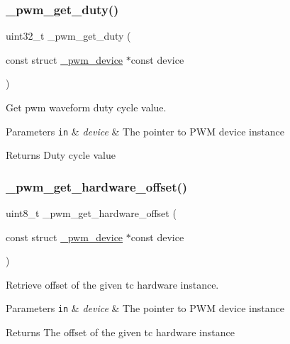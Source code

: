 \subsubsection{\texorpdfstring{\+\_\+pwm\+\_\+get\+\_\+duty()}{\_pwm\_get\_duty()}}
{\footnotesize\ttfamily uint32\+\_\+t \+\_\+pwm\+\_\+get\+\_\+duty (\begin{DoxyParamCaption}\item[{const struct \hyperlink{struct__pwm__device}{\+\_\+pwm\+\_\+device} $\ast$const}]{device }\end{DoxyParamCaption})}



Get pwm waveform duty cycle value. 


\begin{DoxyParams}[1]{Parameters}
\mbox{\tt in}  & {\em device} & The pointer to P\+WM device instance\\
\hline
\end{DoxyParams}
\begin{DoxyReturn}{Returns}
Duty cycle value 
\end{DoxyReturn}
\mbox{\label{group___h_p_l_ga2e9db8f70af92197ac77967d49436aae}} 
\subsubsection{\texorpdfstring{\+\_\+pwm\+\_\+get\+\_\+hardware\+\_\+offset()}{\_pwm\_get\_hardware\_offset()}}
{\footnotesize\ttfamily uint8\+\_\+t \+\_\+pwm\+\_\+get\+\_\+hardware\+\_\+offset (\begin{DoxyParamCaption}\item[{const struct \hyperlink{struct__pwm__device}{\+\_\+pwm\+\_\+device} $\ast$const}]{device }\end{DoxyParamCaption})}



Retrieve offset of the given tc hardware instance. 


\begin{DoxyParams}[1]{Parameters}
\mbox{\tt in}  & {\em device} & The pointer to P\+WM device instance\\
\hline
\end{DoxyParams}
\begin{DoxyReturn}{Returns}
The offset of the given tc hardware instance 
\end{DoxyReturn}
\mbox{\label{group___h_p_l_ga2e95a6e02d2d3f85622820ee8376fa93}} 
